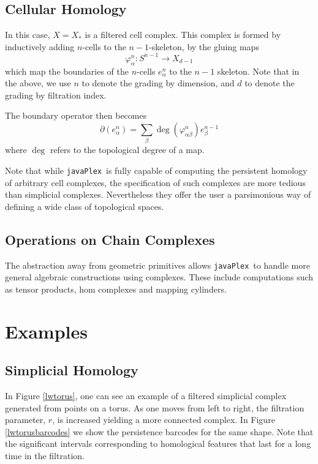\documentclass{gts2012}
\newcommand\javaPlex{\texttt{javaPlex}\ }
\begin{document}
\subsection{Cellular Homology}

In this case, $X = X_*$ is a filtered cell complex. This complex is formed by inductively adding $n$-cells to the $n-1$-skeleton, by the gluing maps 
$$\varphi_{\alpha}^n: S^{n-1} \rightarrow X_{d-1}$$
which map the boundaries of the $n$-cells $e_{\alpha}^n$ to the $n-1$ skeleton. Note that in the above, we use $n$ to denote the grading by dimension, and $d$ to denote the grading by filtration index.

The boundary operator then becomes 
$$\partial(e_{\alpha}^n) = \sum_{\beta} \deg(\varphi_{\alpha \beta}^n) e_{\beta}^{n-1}$$
where $\deg$ refers to the topological degree of a map.

Note that while \javaPlex is fully capable of computing the persistent homology of arbitrary cell complexes, the specification of such complexes are more tedious than simplicial complexes. Nevertheless they offer the user a parsimonious way of defining a wide class of topological spaces.

\subsection{Operations on Chain Complexes}

The abstraction away from geometric primitives allows \javaPlex to handle more general algebraic constructions using complexes. These include computations such as tensor products, hom complexes and mapping cylinders.

\section{Examples}

\subsection{Simplicial Homology}

In Figure \ref{lwtorus}, one can see an example of a filtered simplicial complex generated from points on a torus. As one moves from left to right, the filtration parameter, $r$, is increased yielding a more connected complex. In Figure \ref{lwtorusbarcodes} we show the persistence barcodes for the same shape. Note that the significant intervals corresponding to homological features that last for a long time in the filtration.
\end{document}
